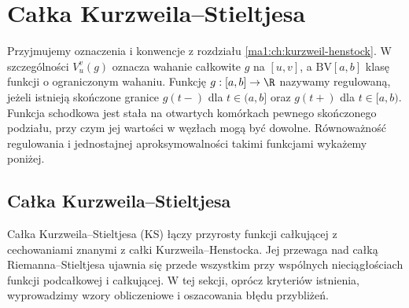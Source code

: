 \chapter{Całka Kurzweila--Stieltjesa}
\providecommand{\atlasref}[2]{#2}
\label{ma1:ch:calka-kurzweila-stieltjesa}
\begingroup
\providecommand{\osc}{\operatorname{osc}}
\providecommand{\Var}{\operatorname{Var}}
\providecommand{\mesh}{\operatorname{mesh}}
\providecommand{\supp}{\operatorname{supp}}
\providecommand{\AC}{\mathrm{AC}}
\providecommand{\BV}{\mathrm{BV}}
\providecommand{\HK}{\mathrm{KH}}
\providecommand{\ind}[1]{\chi_{#1}}
\providecommand{\Dn}{\underline D}
\providecommand{\Du}{\overline D}
\providecommand{\KS}{\mathrm{KS}}
Przyjmujemy oznaczenia i konwencje z rozdziału \ref{ma1:ch:kurzweil-henstock}.
W szczególności $V_u^v(g)$ oznacza wahanie całkowite
$g$ na $[u,v]$, a $\BV[a,b]$ klasę funkcji o ograniczonym
wahaniu. Funkcję $g:[a,b]\to\R$ nazywamy regulowaną,
jeżeli istnieją skończone granice $g(t-)$ dla $t\in(a,b]$
oraz $g(t+)$ dla $t\in[a,b)$.
Funkcja schodkowa jest stała na otwartych komórkach
pewnego skończonego podziału, przy czym jej wartości
w węzłach mogą być dowolne. Równoważność regulowania
i jednostajnej aproksymowalności takimi funkcjami
wykażemy poniżej.
\section{Całka Kurzweila--Stieltjesa}
\label{sec:kurzweil-stieltjes}
Całka Kurzweila--Stieltjesa (KS) łączy przyrosty funkcji całkującej z cechowaniami znanymi z całki Kurzweila--Henstocka. Jej przewaga nad całką Riemanna--Stieltjesa ujawnia się przede wszystkim przy wspólnych nieciągłościach funkcji podcałkowej i całkującej. W tej sekcji, oprócz kryteriów istnienia, wyprowadzimy wzory obliczeniowe i oszacowania błędu przybliżeń.

